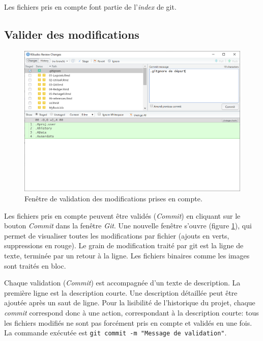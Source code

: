 \documentclass[
  11pt,
  french,
  a4paper,
  extrafontsizes,onecolumn,openright
  ]{memoir}
\begin{document}
Les fichiers pris en compte font partie de l'\emph{index} de git.

\hypertarget{valider-des-modifications}{%
\subsection{Valider des modifications}\label{valider-des-modifications}}



\scriptsize

\begin{figure}

{\centering \includegraphics[width=0.8\linewidth]{images/git-Commit} 

}

\caption{Fenêtre de validation des modifications prises en compte.}\label{fig:git-Commit}
\end{figure}

\normalsize

Les fichiers pris en compte peuvent être validés (\emph{Commit}) en cliquant sur le bouton \emph{Commit} dans la fenêtre \emph{Git}.
Une nouvelle fenêtre s'ouvre (figure \ref{fig:git-Commit}), qui permet de visualiser toutes les modifications par fichier (ajouts en verts, suppressions en rouge).
Le grain de modification traité par git est la ligne de texte, terminée par un retour à la ligne.
Les fichiers binaires comme les images sont traités en bloc.

Chaque validation (\emph{Commit}) est accompagnée d'un texte de description.
La première ligne est la description courte.
Une description détaillée peut être ajoutée après un saut de ligne.
Pour la lisibilité de l'historique du projet, chaque \emph{commit} correspond donc à une action, correspondant à la description courte: tous les fichiers modifiés ne sont pas forcément pris en compte et validés en une fois.
La commande exécutée est \texttt{git\ commit\ -m\ "Message\ de\ validation"}.
\end{document}
